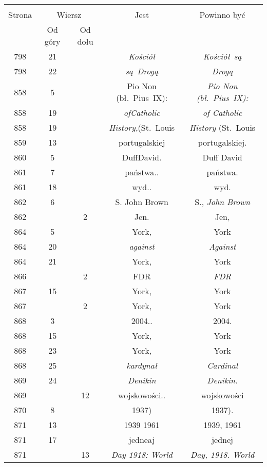 \documentclass[a4paper,11pt]{article}
\begin{document}
\begin{center}
  \begin{tabular}{|c|c|c|c|c|}
    \hline
    & \multicolumn{2}{c|}{} & & \\
    Strona & \multicolumn{2}{c|}{Wiersz} & Jest
                              & Powinno być \\ \cline{2-3}
    & Od góry & Od dołu & & \\
    \hline
    798 & 21 & & \emph{Kościół} & \emph{Kościół~są} \\
    798 & 22 & & \emph{są~Drogą} & \emph{Drogą} \\
    858 &  5 & & Pio Non (bł.~Pius~IX): & \emph{Pio Non (bł.~Pius~IX):} \\
    858 & 19 & & \emph{ofCatholic} & \emph{of Catholic} \\
    858 & 19 & & \emph{History,}(St.~Louis & \emph{History} (St.~Louis \\
    859 & 13 & & portugalskiej & portugalskiej. \\
    860 &  5 & & DuffDavid. & Duff David \\
    861 &  7 & & państwa.. & państwa. \\
    861 & 18 & & wyd.. & wyd. \\
    862 &  6 & & S. John Brown & S., \emph{John Brown} \\
    862 & &  2 & Jen. & Jen, \\
    864 &  5 & & York, & York \\
    864 & 20 & & \emph{against} & \emph{Against} \\
    864 & 21 & & York, & York \\
    866 & &  2 & FDR & \emph{FDR} \\
    867 & 15 & & York, & York \\
    867 & &  2 & York, & York \\
    868 &  3 & & 2004.. & 2004. \\
    868 & 15 & & York, & York \\
    868 & 23 & & York, & York \\
    868 & 25 & & \emph{kardynał} & \emph{Cardinal} \\
    869 & 24 & & \emph{Denikin} & \emph{Denikin.} \\
    869 & & 12 & wojskowości.. & wojskowości \\
    870 &  8 & & 1937) & 1937). \\
    871 & 13 & & 1939 1961 & 1939, 1961 \\
    871 & 17 & & jedneaj & jednej \\
    871 & & 13 & \emph{Day 1918: World} & \emph{Day, 1918. World} \\

\end{tabular}
\end{center}
\end{document}
